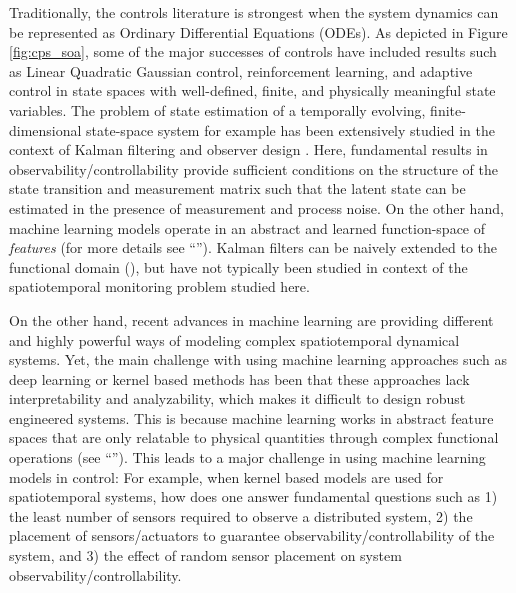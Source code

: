 Traditionally, the controls literature is strongest when the system dynamics can be represented as Ordinary Differential Equations (ODEs). %
As depicted in Figure \ref{fig:cps_soa}, some of the major successes of controls have included results such as Linear Quadratic Gaussian control, reinforcement learning, and adaptive control in state spaces with well-defined, finite, and physically meaningful state variables. The problem of state estimation of a temporally evolving, finite-dimensional state-space system for example has been extensively studied in the context of Kalman filtering and observer design \cite{Gelb74}. Here, fundamental results in observability/controllability provide sufficient conditions on the structure of the state transition and measurement matrix such that the latent state can be estimated in the presence of measurement and process noise. %
On the other hand, machine learning models operate in an abstract and learned function-space of \textit{features} (for more details see ``''). Kalman filters can be naively extended to the functional domain (\cite{mardia1998kriged}), but have not typically been studied in context of the spatiotemporal monitoring problem studied here.  


On the other hand, recent advances in machine learning are providing different and highly powerful ways of modeling complex spatiotemporal dynamical systems.  %
Yet, the main challenge with using machine learning approaches such as deep learning or kernel based methods has been that these approaches lack interpretability and analyzability, which makes it difficult to design robust engineered systems. This is because machine learning works in abstract feature spaces that are only relatable to physical quantities through complex functional operations (see ``''). This leads to a major challenge in using machine learning models in control: For example, when kernel based models are used for spatiotemporal systems, how does one answer fundamental questions such as 1) the least number of sensors required to observe a distributed system, 2) the placement of sensors/actuators to guarantee observability/controllability of the system, and 3) the effect of random sensor placement on system observability/controllability.

